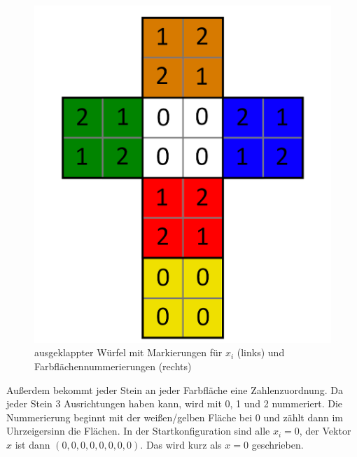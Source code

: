 \documentclass[12pt,a4paper, usenames, dvipsnames]{article}
\begin{document}
\begin{figure}[h]
\includegraphics[scale=0.1]{foldedout_012.png}
\caption[Markierungen $x_i$ (links), Farbflächennummern (rechts)]{ausgeklappter Würfel mit Markierungen für $x_i$ (links) und Farbflächennummerierungen (rechts) }
\end{figure}
Außerdem bekommt jeder Stein an jeder Farbfläche eine Zahlenzuordnung. Da jeder Stein 3 Ausrichtungen haben kann, wird mit 0, 1 und 2 nummeriert. Die Nummerierung beginnt mit der weißen/gelben Fläche bei 0 und zählt dann im Uhrzeigersinn die Flächen. 
In der Startkonfiguration sind alle $x_i = 0$, der Vektor $x$ ist dann $(0, 0, 0, 0, 0, 0, 0, 0)$. Das wird kurz als $x=0$ geschrieben.
\end{document}
